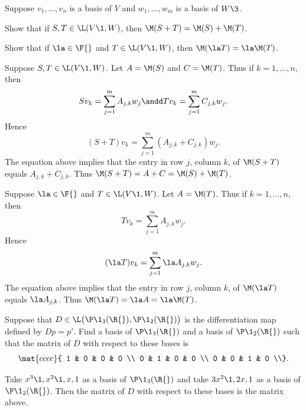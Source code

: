 \exercise
Suppose $v_1, \ldots, v_n$ is a basis of $V$ and $w_1, \ldots, w_m$ is a basis of $W\3$.
\begin{subtheorem}
\item
Show that if $S, T \in \L(V\1, W)$, then $\M(S+T) = \M(S) + \M(T)$.
\item
Show that if $\la \in \F{}$ and $T \in \L(V\1, W)$, then $\M(\la T) = \la \M(T)$.
\end{subtheorem}

\begin{Solution}
\begin{subtheorem}
\item
Suppose $S, T \in \L(V\1, W)$. Let $A = \M(S)$ and $C = \M(T)$. Thus if $k = 1, \dots, n$, then
\[
Sv_k = \sum_{j=1}^m A_{j, k} w_j \andd Tv_k = \sum_{j=1}^m C_{j, k} w_j.
\]
Hence
\[
(S + T)v_k = \sum_{j=1}^m (A_{j, k} + C_{j, k}) w_j.
\]
The equation above implies that the entry in row $j$, column $k$, of $\M(S+T)$ equals $A_{j, k} + C_{j, k}$. Thus
$\M(S+T) = A + C = \M(S) + \M(T)$.

\item
Suppose $\la \in \F{}$ and $T \in \L(V\1, W)$. Let $A = \M(T)$. Thus if $k = 1, \dots, n$, then
\[
Tv_k = \sum_{j=1}^m A_{j, k} w_j.
\]
Hence
\[
(\la T)v_k = \sum_{j=1}^m \la A_{j, k} w_j.
\]
The equation above implies that the entry in row $j$, column $k$, of $\M(\la T)$ equals $\la A_{j, k}$. Thus
$\M(\la T) = \la A = \la \M(T)$.
\end{subtheorem}
\end{Solution}

\exercise
Suppose that $D \in \L\bigl(\P\1_3(\R{}), \P\1_2(\R{}) \bigr)$ is the differentiation map defined by \mbox{$Dp = p'\!$}. Find a basis of $\P\1_3(\R{})$ and a basis of $\P\1_2(\R{})$ such that the matrix of $D$ with respect to these bases is
\[
\mat{cccc}{
1 & 0 & 0 & 0 \\
0 & 1 & 0 & 0 \\
0 & 0 & 1 & 0 \\}.
\]
\vspace{-.15in}

\begin{Solution}
Take $x^3\1, x^2\1, x, 1$ as a basis of $\P\1_3(\R{})$ and take $3x^2\1, 2x, 1$ as a basis of $\P\1_2(\R{})$. Then the matrix of $D$ with respect to these bases is the matrix above.
\end{Solution}


